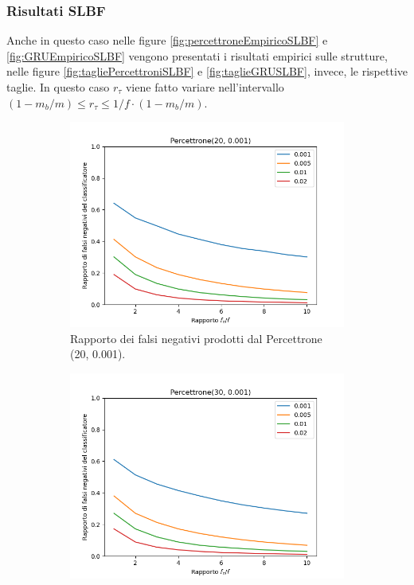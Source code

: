 \documentclass[../../main.tex]{subfiles}
\begin{document}
    \subsubsection{Risultati SLBF}
    Anche in questo caso nelle figure \ref{fig:percettroneEmpiricoSLBF} e \ref{fig:GRUEmpiricoSLBF} vengono presentati i risultati empirici sulle strutture, nelle figure \ref{fig:tagliePercettroniSLBF} e \ref{fig:taglieGRUSLBF}, invece, le rispettive taglie. In questo caso $r_{\tau}$ viene fatto variare nell'intervallo $(1 - m_b/m) \leq r_{\tau} \leq 1/f \cdot \left(1 - m_b/m\right)$.
    \begin{figure}[H]
        \centering
        \begin{subfigure}[b]{0.49\textwidth}
            \centering
            \includegraphics[width = \textwidth]{immagini/7/SLBF/Percettrone(20, 0.001)_FNR.png}
            \caption{Rapporto dei falsi negativi prodotti dal Percettrone (20, 0.001).}
            \label{fig:SLBFFNRPercettrone20}
        \end{subfigure}
        \begin{subfigure}[b]{0.49\textwidth}
            \centering
            \includegraphics[width = \textwidth]{immagini/7/SLBF/Percettrone(30, 0.001)_FNR.png}

\end{subfigure}
\end{figure}
\end{document}
